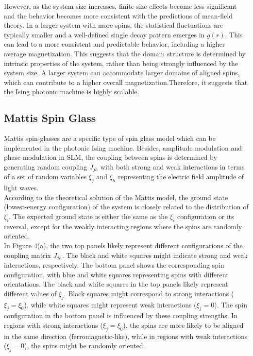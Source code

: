 However, as the system size increases, finite-size effects become less significant and the behavior becomes more consistent with the predictions of mean-field theory. In a larger system with more spins, the statistical fluctuations are typically smaller and a well-defined single decay pattern emerges in $g(r)$. This can lead to a more consistent and predictable behavior, including a higher average magnetization. This suggests that the domain structure is determined by intrinsic properties of the system, rather than being strongly influenced by the system size. A larger system can accommodate larger domains of aligned spins, which can contribute to a higher overall magnetization.Therefore, it suggests that the Ising photonic machine is highly scalable.\\


\subsection{Mattis Spin Glass}
Mattis spin-glasses are a specific type of spin glass model which can be implemented in the photonic Ising machine. Besides, amplitude modulation and phase modulation in SLM, the coupling between spins is determined by generating random coupling $J_{jh}$ with both strong and weak interactions in terms of a set of random variables $\xi_j$ and $\xi_h$ representing the electric field amplitude of light waves. \\

According to the theoretical solution of the Mattis model, the ground state (lowest-energy configuration) of the system is closely related to the distribution of $\xi_i$. The expected ground state is either the same as the $\xi_i$ configuration or its reversal, except for the weakly interacting regions where the spins are randomly oriented.\\

In Figure 4(a), the two top panels likely represent different configurations of the coupling matrix $J_{jh}$. The black and white squares might indicate strong and weak interactions, respectively. The bottom panel shows the corresponding spin configuration, with blue and white squares representing spins with different orientations. The black and white squares in the top panels likely represent different values of $\xi_j$. Black squares might correspond to strong interactions ($\xi_j = \xi_0$), while white squares might represent weak interactions ($\xi_j = 0$). The spin configuration in the bottom panel is influenced by these coupling strengths. In regions with strong interactions ($\xi_j = \xi_0$), the spins are more likely to be aligned in the same direction (ferromagnetic-like), while in regions with weak interactions ($\xi_j = 0$), the spins might be randomly oriented.\\

